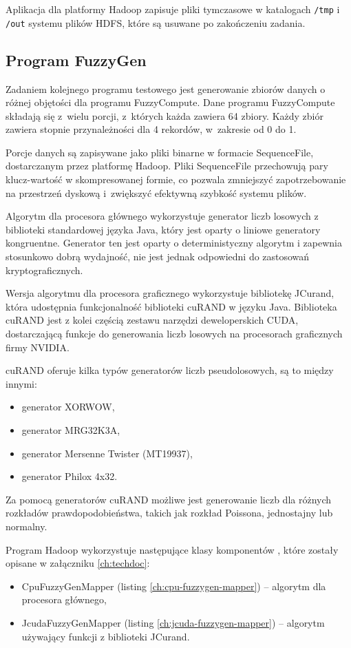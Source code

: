 Aplikacja dla platformy Hadoop zapisuje pliki tymczasowe w katalogach \lstinline{/tmp} i \lstinline{/out}
systemu plików HDFS, które są usuwane po zakończeniu zadania.

\subsection{Program FuzzyGen}

Zadaniem kolejnego programu testowego jest generowanie zbiorów danych o różnej objętości dla programu
FuzzyCompute. Dane programu FuzzyCompute składają się z~wielu porcji, z~których każda zawiera 64
zbiory. Każdy zbiór zawiera stopnie przynależności dla 4 rekordów, w~zakresie od 0 do 1.

Porcje danych są zapisywane jako pliki binarne w formacie SequenceFile, dostarczanym przez platformę
Hadoop. Pliki SequenceFile przechowują pary klucz-wartość w skompresowanej formie, co pozwala
zmniejszyć zapotrzebowanie na przestrzeń dyskową i~zwiększyć efektywną szybkość systemu plików.

Algorytm dla procesora głównego wykorzystuje generator liczb losowych z biblioteki standardowej języka Java,
który jest oparty o liniowe generatory kongruentne. Generator ten jest oparty o deterministyczny algorytm i
zapewnia stosunkowo dobrą wydajność, nie jest jednak odpowiedni do zastosowań kryptograficznych.

Wersja algorytmu dla procesora graficznego wykorzystuje bibliotekę JCurand, która udostępnia
funkcjonalność biblioteki cuRAND w języku Java. Biblioteka cuRAND jest z kolei częścią zestawu narzędzi
deweloperskich CUDA, dostarczającą funkcje do generowania liczb losowych na procesorach graficznych
firmy NVIDIA.
\newpage

cuRAND oferuje kilka typów generatorów liczb pseudolosowych, są to między innymi:
\begin{itemize}
	\item generator XORWOW,
	\item generator MRG32K3A,
	\item generator Mersenne Twister (MT19937),
	\item generator Philox 4x32.
\end{itemize}

Za pomocą generatorów cuRAND możliwe jest generowanie liczb dla różnych rozkładów prawdopodobieństwa,
takich jak rozkład Poissona, jednostajny lub normalny.

Program Hadoop wykorzystuje następujące klasy komponentów ,
które zostały opisane w załączniku \ref{ch:techdoc}:
\begin{itemize}
	\item CpuFuzzyGenMapper (listing \ref{ch:cpu-fuzzygen-mapper}) -- algorytm dla procesora głównego,
	\item JcudaFuzzyGenMapper (listing \ref{ch:jcuda-fuzzygen-mapper}) -- algorytm używający funkcji z biblioteki JCurand.
\end{itemize}

